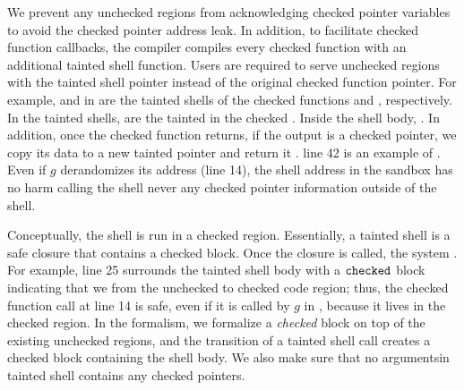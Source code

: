 % 
We prevent any unchecked regions from acknowledging checked pointer variables to
avoid the checked pointer address leak.  In addition, to facilitate checked
function callbacks, the \systemname{} compiler compiles every checked function
with an additional tainted shell function.  Users are required to serve
unchecked regions with the tainted shell pointer instead of the original checked
function pointer.  For example,  and
 in  are the tainted
shells of the checked functions  and ,
respectively.  In the tainted shells,  
 are the tainted   in the  checked 
.  
% 
Inside the shell body,   .   
% 
In addition, once the checked function returns, if the output is a checked
pointer, we copy its data to a new tainted pointer and return it .   line 42 is an example of
 .  Even
if $g$ derandomizes its address (line 14), the shell address  in the
sandbox  has no harm   calling the shell never
  any checked pointer information outside of the shell.
% 

% 
Conceptually, the shell is run in a checked region.  Essentially, a tainted
shell is a safe closure that contains a checked block.  Once the closure is
called, the system  .  For example,  line 25 surrounds
the tainted shell body with a $\mathtt{checked}$ block indicating that we
  from
the unchecked to checked code region; thus, the checked function call at
 line 14 is safe, even if it is called by $g$ in
, because it lives in the checked region.  In the
\systemname{} formalism, we formalize a \textit{checked} block on top of the
existing unchecked regions, and the transition of a tainted shell call creates a
checked block containing the shell body.  We also make sure that no
argumentsin   tainted shell
contains any checked pointers.
%

